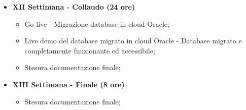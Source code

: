 {\begin{itemize}
        \item \textbf{XII Settimana - Collaudo (24 ore)} %
        \begin{itemize}
            \item Go live - Migrazione database in cloud Oracle;
            \item Live demo del database migrato in cloud Oracle - Database migrato e completamente funzionante ed accessibile;
            \item Stesura documentazione finale;
        \end{itemize}

        \item \textbf{XIII Settimana - Finale (8 ore)} %
        \begin{itemize}
            \item Stesura documentazione finale;
        \end{itemize}
    \end{itemize}
}

\newcommand{\totaleOre}{300}

\newcommand{\obiettiviObbligatori}{
	 \item \underline{\textit{O01}}: Apprendere le nozioni fondamentali per la gestione di un database Oracle;
	 \item \underline{\textit{O02}}: Conoscere le soluzione per i database Oracle su OCI (Oracle Cloud Infrastructure) e saper effettuare provisioning di database;
	 \item \underline{\textit{O03}}: Conoscere le principali tecniche di migrazione di database su cloud;
	 \item \underline{\textit{O04}}: Realizzare un caso concreto di migrazione di un database su cloud Oracle;	 
}

\newcommand{\obiettiviDesiderabili}{
	 \item \underline{\textit{D01}}: Conoscere e saper gestire Oracle Autonomous DB;
}

\newcommand{\obiettiviFacoltativi}{
	 \item \underline{\textit{F01}}: Realizzare la migrazione di un database su Oracle Autonomous DB;
}